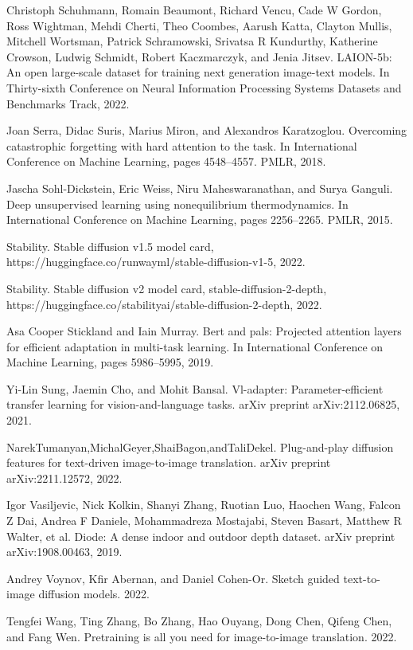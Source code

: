 \documentclass[a4paper,AutoFakeBold,oneside,12pt]{book}
\begin{document}
\begin{nopagenumber}
\noindent
[79] Christoph Schuhmann, Romain Beaumont, Richard Vencu, Cade W Gordon, Ross Wightman, Mehdi Cherti, Theo Coombes, Aarush Katta, Clayton Mullis, Mitchell Wortsman, Patrick Schramowski, Srivatsa R Kundurthy, Katherine Crowson, Ludwig Schmidt, Robert Kaczmarczyk, and Jenia Jitsev. LAION-5b: An open large-scale dataset for training next generation image-text models. In Thirty-sixth Conference on Neural Information Processing Systems Datasets and Benchmarks Track, 2022.

\noindent
[80] Joan Serra, Didac Suris, Marius Miron, and Alexandros Karatzoglou. Overcoming catastrophic forgetting with hard attention to the task. In International Conference on Machine Learning, pages 4548–4557. PMLR, 2018.

\noindent
[81] Jascha Sohl-Dickstein, Eric Weiss, Niru Maheswaranathan, and Surya Ganguli. Deep unsupervised learning using nonequilibrium thermodynamics. In International Conference on Machine Learning, pages 2256–2265. PMLR, 2015.

\noindent
[82] Stability. Stable diffusion v1.5 model card, https://huggingface.co/runwayml/stable-diffusion-v1-5, 2022.

\noindent
[83] Stability. Stable diffusion v2 model card, stable-diffusion-2-depth, https://huggingface.co/stabilityai/stable-diffusion-2-depth, 2022.

\noindent
[84] Asa Cooper Stickland and Iain Murray. Bert and pals: Projected attention layers for efficient adaptation in multi-task learning. In International Conference on Machine Learning, pages 5986–5995, 2019.

\noindent
[85] Yi-Lin Sung, Jaemin Cho, and Mohit Bansal. Vl-adapter: Parameter-efficient transfer learning for vision-and-language tasks. arXiv preprint arXiv:2112.06825, 2021.

\noindent
[86] NarekTumanyan,MichalGeyer,ShaiBagon,andTaliDekel. Plug-and-play diffusion features for text-driven image-to-image translation. arXiv preprint arXiv:2211.12572, 2022.

\noindent
[87] Igor Vasiljevic, Nick Kolkin, Shanyi Zhang, Ruotian Luo, Haochen Wang, Falcon Z Dai, Andrea F Daniele, Mohammadreza Mostajabi, Steven Basart, Matthew R Walter, et al. Diode: A dense indoor and outdoor depth dataset. arXiv preprint arXiv:1908.00463, 2019.

\noindent
[88] Andrey Voynov, Kfir Abernan, and Daniel Cohen-Or. Sketch guided text-to-image diffusion models. 2022.

\noindent
[89] Tengfei Wang, Ting Zhang, Bo Zhang, Hao Ouyang, Dong Chen, Qifeng Chen, and Fang Wen. Pretraining is all you need for image-to-image translation. 2022.


\end{nopagenumber}
\end{document}
